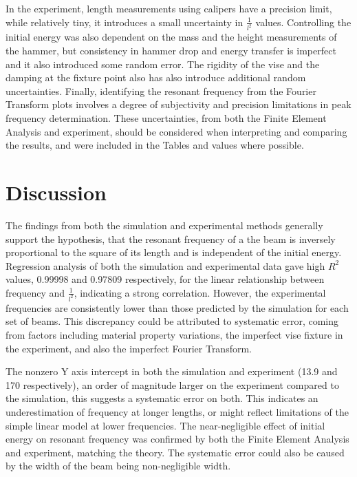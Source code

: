 \documentclass[a4paper,12pt]{article}
\begin{document}
    In the experiment, length measurements using calipers have a precision limit, while relatively tiny, it introduces a small uncertainty in $\frac{1}{l^2}$ values.
    Controlling the initial energy was also dependent on the mass and the height measurements of the hammer, but consistency in hammer drop and energy transfer is imperfect and it also introduced some random error.
    The rigidity of the vise and the damping at the fixture point also has also introduce additional random uncertainties.
    Finally, identifying the resonant frequency from the Fourier Transform plots involves a degree of subjectivity and precision limitations in peak frequency determination.
    These uncertainties, from both the Finite Element Analysis and experiment, should be considered when interpreting and comparing the results, and were included in the Tables and values where possible.

\section{Discussion}%

The findings from both the simulation and experimental methods generally support the hypothesis, that the resonant frequency of a the beam is inversely proportional to the square of its length and is independent of the initial energy.  Regression analysis of both the simulation and experimental data gave high $R^2$ values, 0.99998 and 0.97809 respectively, for the linear relationship between frequency and $\frac{1}{l^2}$, indicating a strong correlation. However, the experimental frequencies are consistently lower than those predicted by the simulation for each set of beams. This discrepancy could be attributed to systematic error, coming from factors including material property variations, the imperfect vise fixture in the experiment, and also the imperfect Fourier Transform.

The nonzero Y axis intercept in both the simulation and experiment (13.9 and 170 respectively), an order of magnitude larger on the experiment compared to the simulation, this suggests a systematic error on both. This indicates an underestimation of frequency at longer lengths, or might reflect limitations of the simple linear model at lower frequencies.
The near-negligible effect of initial energy on resonant frequency was confirmed by both the Finite Element Analysis and experiment, matching the theory. The systematic error could also be caused by the width of the beam being non-negligible width.
\end{document}
